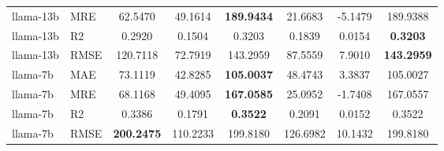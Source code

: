 \begin{table}[t]
\begin{tabular}{llcccccc}
llama-13b & MRE & 62.5470 & 49.1614 & \textbf{189.9434} & 21.6683 & -5.1479 & 189.9388 \\
llama-13b & R2 & 0.2920 & 0.1504 & 0.3203 & 0.1839 & 0.0154 & \textbf{0.3203} \\
llama-13b & RMSE & 120.7118 & 72.7919 & 143.2959 & 87.5559 & 7.9010 & \textbf{143.2959} \\
\addlinespace
llama-7b & MAE & 73.1119 & 42.8285 & \textbf{105.0037} & 48.4743 & 3.3837 & 105.0027 \\
llama-7b & MRE & 68.1168 & 49.4095 & \textbf{167.0585} & 25.0952 & -1.7408 & 167.0557 \\
llama-7b & R2 & 0.3386 & 0.1791 & \textbf{0.3522} & 0.2091 & 0.0152 & 0.3522 \\
llama-7b & RMSE & \textbf{200.2475} & 110.2233 & 199.8180 & 126.6982 & 10.1432 & 199.8180 \\
\bottomrule
\end{tabular}
\end{table}
